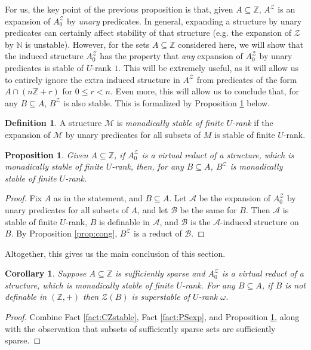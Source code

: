 \documentclass{amsart}
\def\seq{\subseteq}
\newcommand{\cA}{\mathcal{A}}
\newcommand{\cB}{\mathcal{B}}
\newcommand{\cM}{\mathcal{M}}
\newcommand{\cZ}{\mathcal{Z}}
\def\N{\mathbb N}
\def\Z{\mathbb Z}
\newtheorem{corollary}[theorem]{Corollary}
\newtheorem{proposition}[theorem]{Proposition}
\theoremstyle{definition}
\newtheorem{definition}[theorem]{Definition}
\begin{document}
For us, the key point of the previous proposition is that, given $A\seq\Z$, $A^{\cZ}$ is an expansion of $A^{\cZ}_0$ by \emph{unary} predicates. In general, expanding a structure by unary predicates can certainly affect stability of that structure (e.g. the expansion of $\cZ$ by $\N$ is unstable). However, for the sets $A\seq\Z$ considered here, we will show that the induced structure $A^{\cZ}_0$ has the property that \emph{any} expansion of $A^{\cZ}_0$ by unary predicates is stable of $U$-rank $1$. This will be extremely useful, as it will allow us to entirely ignore the extra induced structure in $A^{\cZ}$ from predicates of the form $A\cap(n\Z+r)$ for $0\leq r<n$. Even more, this will allow us to conclude that, for any $B\seq A$, $B^{\cZ}$ is also stable. This is formalized by Proposition \ref{prop:IRsub} below. 


\begin{definition}
A structure $\cM$ is \emph{monadically stable of finite $U$-rank} if the expansion of $\cM$ by unary predicates for all subsets of $M$ is stable of finite $U$-rank.
\end{definition}



\begin{proposition}\label{prop:IRsub}
Given $A\seq\Z$, if $A^{\cZ}_0$ is a virtual reduct of a structure, which is monadically stable of finite $U$-rank, then, for any $B\seq A$, $B^{\cZ}$ is monadically stable of finite $U$-rank. 
\end{proposition}
\begin{proof}
Fix $A$ as in the statement, and $B\seq A$. Let $\cA$ be the expansion of $A^{\cZ}_0$ by unary predicates for all subsets of $A$, and let $\cB$ be the same for $B$. Then $\cA$ is stable of finite $U$-rank, $B$ is definable in $\cA$, and $\cB$ is the $\cA$-induced structure on $B$. By Proposition \ref{prop:cong}, $B^{\cZ}$ is a reduct of $\cB$.
\end{proof}

Altogether, this gives us the main conclusion of this section. 

\begin{corollary}\label{cor:mainstab}
Suppose $A\seq\Z$ is sufficiently sparse and $A^{\cZ}_0$ is a virtual reduct of a structure, which is monadically stable of finite $U$-rank. For any $B\seq A$, if $B$ is not definable in $(\Z,+)$ then $\cZ(B)$ is superstable of $U$-rank $\omega$.
\end{corollary}
\begin{proof}
Combine Fact \ref{fact:CZstable}, Fact \ref{fact:PSexp}, and Proposition \ref{prop:IRsub}, along with the observation that subsets of sufficiently sparse sets are sufficiently sparse.
\end{proof}
\end{document}
